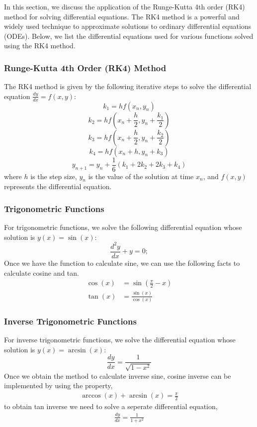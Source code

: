 \documentclass[a4paper,12pt]{article}
\begin{document}
In this section, we discuss the application of the Runge-Kutta 4th order (RK4) method for solving differential equations. The RK4 method is a powerful and widely used technique to approximate solutions to ordinary differential equations (ODEs). Below, we list the differential equations used for various functions solved using the RK4 method.

\subsubsection*{Runge-Kutta 4th Order (RK4) Method}

The RK4 method is given by the following iterative steps to solve the differential equation \( \frac{dy}{dx} = f(x, y) \):
\[
k_1 = h f(x_n, y_n)
\]
\[
k_2 = h f\left( x_n + \frac{h}{2}, y_n + \frac{k_1}{2} \right)
\]
\[
k_3 = h f\left( x_n + \frac{h}{2}, y_n + \frac{k_2}{2} \right)
\]
\[
k_4 = h f(x_n + h, y_n + k_3)
\]
\[
y_{n+1} = y_n + \frac{1}{6} \left( k_1 + 2k_2 + 2k_3 + k_4 \right)
\]
where \( h \) is the step size, \( y_n \) is the value of the solution at time \( x_n \), and \( f(x, y) \) represents the differential equation.

\subsubsection*{Trigonometric Functions}

For trigonometric functions, we solve the following differential equation whose solution is \( y(x) = \sin(x) \):
\[
\frac{d^2y}{dx} + y = 0;
\]
 Once we have the function to calculate sine, we can use the following facts to calculate cosine and tan. 
\begin{align*} 
 \cos(x) &= \sin \left( \frac{\pi}{2} - x \right)\\ 
 \tan(x) &= \frac{\sin(x)}{\cos(x)}
\end{align*}

\subsubsection*{Inverse Trigonometric Functions}

For inverse trigonometric functions, we solve the differential equation whose solution is \( y(x) = \arcsin(x) \):
\[
\frac{dy}{dx} = \frac{1}{\sqrt{1 - x^2}}
\]
Once we obtain the method to calculate inverse sine, cosine inverse can be implemented by using the property, 
\begin{align*}
    \arccos(x) + \arcsin(x) = \frac{\pi}{2}
\end{align*}
to obtain tan inverse we need to solve a seperate differential equation,
\begin{align*}
    \frac{dy}{dx} = \frac{1}{1+x^2}
\end{align*}
\end{document}
